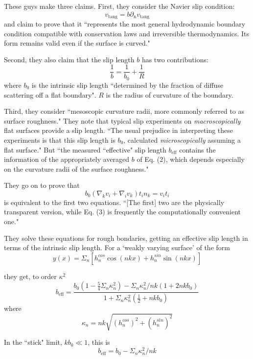 \documentclass{article}
\begin{document}
These guys make three claims.
First, they consider the Navier slip condition:
\begin{equation} v_{\mathrm{tang}} = b \partial_{\mathrm{n}} v_{\mathrm{tang}} \end{equation}
and claim to prove that it ``represents the most general hydrodynamic boundary condition compatible with conservation laws and irreversible thermodynamics.  Its form remains valid even if the surface is curved."

Second, they also claim that the slip length $b$ has two contributions:
\begin{equation} \frac{1}{b} = \frac{1}{b_{0}} + \frac{1}{R} \end{equation}
where $b_{0}$ is the intrinsic slip length ``determined by the fraction of diffuse scattering off a flat boundary". $R$ is the radius of curvature of the boundary.

Third, they consider ``mesoscopic curvature radii, more commonly referred to as surface roughness."  They note that typical slip experiments on \emph{macroscopically} flat surfaces provide a slip length. ``The usual prejudice in interpreting these experiments is that this slip length is $b_{0}$, calculated \emph{microscopically} assuming a flat surface." But ``the measured ``effective" slip length $b_{\mathrm{eff}}$ contains the information of the appropriately averaged $b$ of Eq. (2), which depends especially on the curvature radii of the surface roughness."

They go on to prove that
\begin{equation}
b_{0} (\nabla_{k} v_{i} + \nabla_{i} v_{k}) t_{i} n_{k} = v_{i} t_{i}
\end{equation}
is equivalent to the first two equations. ``[The first] two are the physically transparent version, while Eq. (3) is frequently the computationally convenient one."

They solve these equations for rough bondaries, getting an effective slip length in terms of the intrinsic slip length.
For a `weakly varying surface' of the form
\[ y(x) = \Sigma_{n} [h_{n}^{cos} \cos (nkx) + h_{n}^{sin} \sin (nkx)] \]

they get, to order $\kappa^{2}$
\[ b_{\mathrm{eff}} = \frac{b_{0} (1-\frac{5}{4} \Sigma_{n} \kappa_{n}^{2})
 - \Sigma_{n} \kappa_{n}^{2}/nk (1 + 2nk b_{0})}
{1 + \Sigma_{n} \kappa_{n}^{2} (\frac{1}{2} +nkb_{0}) } \]
where
\[ \kappa_{n} = nk \sqrt{(h_{n}^{cos})^{2} + (h_{n}^{sin})^{2}} \]

In the ``stick" limit, $kb_{0} \ll 1$, this is
\[ b_{\mathrm{eff}} = b_{0} - \Sigma_{n} \kappa_{n}^{2} /nk \]
\end{document}
